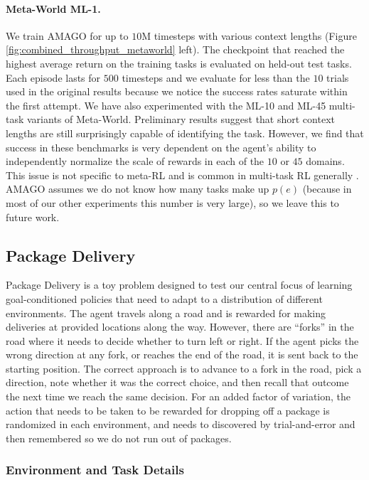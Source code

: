 \paragraph{Meta-World ML-1.} We train AMAGO for up to $10$M timesteps with various context lengths (Figure \ref{fig:combined_throughput_metaworld} left). The checkpoint that reached the highest average return on the training tasks is evaluated on held-out test tasks. Each episode lasts for $500$ timesteps and we evaluate for less than the $10$ trials used in the original results \cite{yu2020meta} because we notice the success rates saturate within the first attempt. We have also experimented with the ML-10 and ML-45 multi-task variants of Meta-World. Preliminary results suggest that short context lengths are still surprisingly capable of identifying the task. However, we find that success in these benchmarks is very dependent on the agent's ability to independently normalize the scale of rewards in each of the $10$ or $45$ domains. This issue is not specific to meta-RL and is common in multi-task RL generally \cite{van2016learning, kurin2022defense}. AMAGO assumes we do not know how many tasks make up $p(e)$ (because in most of our other experiments this number is very large), so we leave this to future work.

\subsection{Package Delivery}
\label{app:experiment_details:package}
Package Delivery is a toy problem designed to test our central focus of learning goal-conditioned policies that need to adapt to a distribution of different environments. The agent travels along a road and is rewarded for making deliveries at provided locations along the way. However, there are ``forks'' in the road where it needs to decide whether to turn left or right. If the agent picks the wrong direction at any fork, or reaches the end of the road, it is sent back to the starting position. The correct approach is to advance to a fork in the road, pick a direction, note whether it was the correct choice, and then recall that outcome the next time we reach the same decision. For an added factor of variation, the action that needs to be taken to be rewarded for dropping off a package is randomized in each environment, and needs to discovered by trial-and-error and then remembered so we do not run out of packages. 

\subsubsection{Environment and Task Details}

